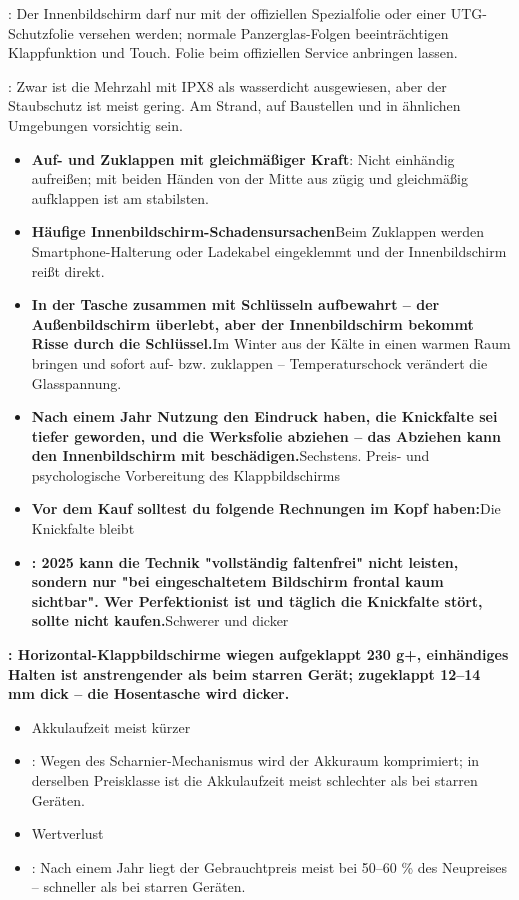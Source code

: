 
: Der Innenbildschirm darf nur mit der offiziellen Spezialfolie oder einer UTG-Schutzfolie versehen werden; normale Panzerglas-Folgen beeinträchtigen Klappfunktion und Touch. Folie beim offiziellen Service anbringen lassen.


: Zwar ist die Mehrzahl mit IPX8 als wasserdicht ausgewiesen, aber der Staubschutz ist meist gering. Am Strand, auf Baustellen und in ähnlichen Umgebungen vorsichtig sein.

\begin{itemize}
  \item \textbf{Auf- und Zuklappen mit gleichmäßiger Kraft}: Nicht einhändig aufreißen; mit beiden Händen von der Mitte aus zügig und gleichmäßig aufklappen ist am stabilsten.
  \item \textbf{Häufige Innenbildschirm-Schadensursachen}Beim Zuklappen werden Smartphone-Halterung oder Ladekabel eingeklemmt und der Innenbildschirm reißt direkt.
  \item \textbf{In der Tasche zusammen mit Schlüsseln aufbewahrt – der Außenbildschirm überlebt, aber der Innenbildschirm bekommt Risse durch die Schlüssel.}Im Winter aus der Kälte in einen warmen Raum bringen und sofort auf- bzw. zuklappen – Temperaturschock verändert die Glasspannung.
  \item \textbf{Nach einem Jahr Nutzung den Eindruck haben, die Knickfalte sei tiefer geworden, und die Werksfolie abziehen – das Abziehen kann den Innenbildschirm mit beschädigen.}Sechstens. Preis- und psychologische Vorbereitung des Klappbildschirms
  \item \textbf{Vor dem Kauf solltest du folgende Rechnungen im Kopf haben:}Die Knickfalte bleibt
  \item \textbf{: 2025 kann die Technik "vollständig faltenfrei" nicht leisten, sondern nur "bei eingeschaltetem Bildschirm frontal kaum sichtbar". Wer Perfektionist ist und täglich die Knickfalte stört, sollte nicht kaufen.}Schwerer und dicker
\end{itemize}

\textbf{: Horizontal-Klappbildschirme wiegen aufgeklappt 230 g+, einhändiges Halten ist anstrengender als beim starren Gerät; zugeklappt 12–14 mm dick – die Hosentasche wird dicker.}\par

\begin{itemize}
  \item Akkulaufzeit meist kürzer
  \item : Wegen des Scharnier-Mechanismus wird der Akkuraum komprimiert; in derselben Preisklasse ist die Akkulaufzeit meist schlechter als bei starren Geräten.
  \item Wertverlust
  \item : Nach einem Jahr liegt der Gebrauchtpreis meist bei 50–60 \% des Neupreises – schneller als bei starren Geräten.
\end{itemize}

